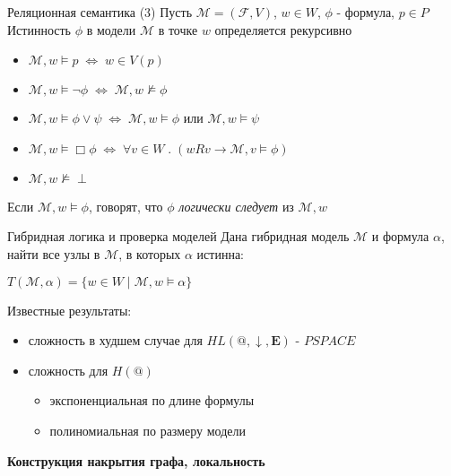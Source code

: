 \documentclass{beamer}
\begin{document}
\begin{frame}{Реляционная семантика (3)}
Пусть $\mathcal{M} = (\mathcal{F}, V)$, $w \in W$, $\phi$ - формула, $p \in P$\\
\bigskip
Истинность $\phi$ в модели $\mathcal{M}$ в точке $w$ определяется рекурсивно\\
\bigskip
\begin{itemize}
  \item $\mathcal{M}, w \models p \; \Longleftrightarrow \; w \in V(p)$
  \item $\mathcal{M}, w \models \neg \phi \; \Longleftrightarrow \; \mathcal{M}, w \not\models \phi$
  \item $\mathcal{M}, w \models \phi \vee \psi \; \Longleftrightarrow \; \mathcal{M}, w \models \phi$ или $\mathcal{M}, w \models \psi$
  \item $\mathcal{M}, w \models \Box \phi \; \Longleftrightarrow \; \forall v \in W \; . \; (w R v \to \mathcal{M}, v \models \phi)$
  \item $\mathcal{M}, w \not\models \perp$
\end{itemize}
\bigskip
Если $\mathcal{M}, w \models \phi$, говорят, что $\phi$ \textit{логически следует} из $\mathcal{M}, w$
\end{frame}

\begin{frame}{Гибридная логика и проверка моделей}
Дана гибридная модель $\mathcal{M}$ и формула $\alpha$, найти все узлы в $\mathcal{M}$, в которых $\alpha$ истинна:
\bigskip
\begin{center}
    $T(\mathcal{M}, \alpha) = \{ w \in W \; | \; \mathcal{M}, w \models \alpha \}$
\end{center}
\bigskip
Известные результаты:\\  %
\bigskip
\begin{itemize}
	\item сложность в худшем случае для $HL(@, \downarrow, \textbf{E})$ - $PSPACE$
	\item сложность для $H(@)$ 
		\begin{itemize}
			\item экспоненциальная по длине формулы
			\item полиномиальная по размеру модели
		\end{itemize}
\end{itemize}
\end{frame}



\begin{frame}{}
\begin{center}
	\textbf{Конструкция накрытия графа, локальность}
\end{center}
\end{frame}
\end{document}
